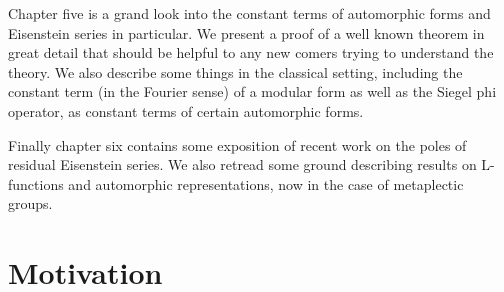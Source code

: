 Chapter five is a grand look into the constant terms of automorphic forms and Eisenstein series in particular. We present a proof of a well known theorem in great detail that should be helpful to any new comers trying to understand the theory. We also describe some things in the classical setting, including the constant term (in the Fourier sense) of a modular form as well as the Siegel phi operator, as constant terms of certain automorphic forms. 

Finally chapter six contains some exposition of recent work on the poles of residual Eisenstein series. We also retread some ground describing results on L-functions and automorphic representations, now in the case of metaplectic groups.

\section*{Motivation}
